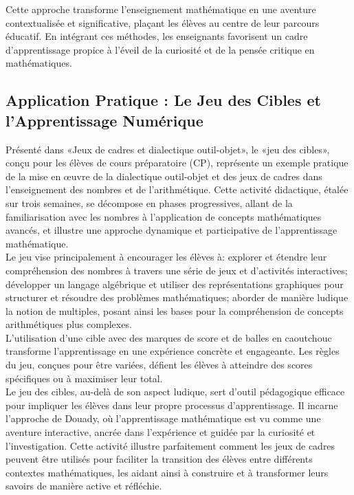 Cette approche transforme l'enseignement mathématique en une aventure contextualisée et significative,
plaçant les élèves au centre de leur parcours éducatif.
En intégrant ces méthodes,
les enseignants favorisent un cadre d'apprentissage propice à l'éveil de la curiosité et de la pensée critique en mathématiques.

\subsection{Application Pratique : Le Jeu des Cibles et l'Apprentissage Numérique}

Présenté dans «Jeux de cadres et dialectique outil-objet»,
le «jeu des cibles»,
conçu pour les élèves de cours préparatoire (CP),
représente un exemple pratique de la mise en œuvre de la dialectique outil-objet et des jeux de cadres dans l'enseignement des nombres et de l'arithmétique.
Cette activité didactique,
étalée sur trois semaines,
se décompose en phases progressives,
allant de la familiarisation avec les nombres à l'application de concepts mathématiques avancés,
et illustre une approche dynamique et participative de l'apprentissage mathématique.\\

Le jeu vise principalement à encourager les élèves à:
explorer et étendre leur compréhension des nombres à travers une série de jeux et d'activités interactives;
développer un langage algébrique et utiliser des représentations graphiques pour structurer et résoudre des problèmes mathématiques;
aborder de manière ludique la notion de multiples,
posant ainsi les bases pour la compréhension de concepts arithmétiques plus complexes.\\

L'utilisation d'une cible avec des marques de score et de balles en caoutchouc transforme l'apprentissage en une expérience concrète et engageante.
Les règles du jeu,
conçues pour être variées,
défient les élèves à atteindre des scores spécifiques ou à maximiser leur total.\\

Le jeu des cibles, au-delà de son aspect ludique,
sert d'outil pédagogique efficace pour impliquer les élèves dans leur propre processus d'apprentissage.
Il incarne l'approche de Douady,
où l'apprentissage mathématique est vu comme une aventure interactive,
ancrée dans l'expérience et guidée par la curiosité et l'investigation.
Cette activité illustre parfaitement comment les jeux de cadres peuvent être utilisés pour faciliter la transition des élèves entre différents contextes mathématiques,
les aidant ainsi à construire et à transformer leurs savoirs de manière active et réfléchie.\\

